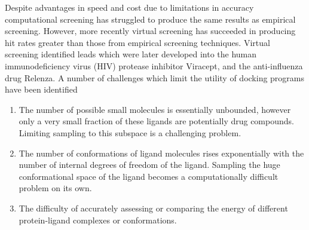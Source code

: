 Despite advantages in speed and cost due to limitations in accuracy computational screening has struggled to produce the same results as empirical screening.
However, more recently virtual screening has succeeded in producing hit rates greater than those from empirical screening techniques.
Virtual screening identified leads which were later developed into the human immunodeficiency virus (HIV) protease inhibitor Viracept, and the anti-influenza drug Relenza.
A number of challenges which limit the utility of docking programs have been identified
\begin{enumerate}
\item The number of possible small molecules is essentially unbounded, however only a very small fraction of these ligands are potentially drug compounds. Limiting sampling to this subspace is a challenging problem.
\item The number of conformations of ligand molecules rises exponentially with the number of internal degrees of freedom of the ligand. Sampling the huge conformational space of the ligand becomes a computationally difficult problem on its own.
\item The difficulty of accurately assessing or comparing the energy of different protein-ligand complexes or conformations.
\end{enumerate}
 \cite{shoichet2004virtual}
